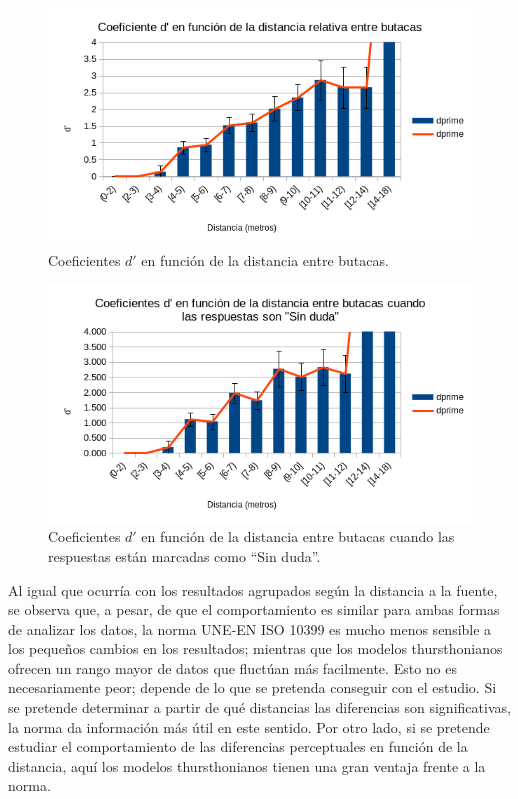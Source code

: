 \documentclass[11pt,a4paper,twoside]{book}
\begin{document}
		    \begin{figure}
                \includegraphics[scale=0.7]{../imagenes/analisisThurstButacasDuda.png}
			    \centering
			    \caption{Coeficientes $d'$ en función de la distancia entre butacas.} 
			    \label{fig:ThurstButacasDuda}
            \end{figure}
            
            \begin{figure}
                \includegraphics[scale=0.7]{../imagenes/analisisThurstButacasSinDuda.png}
			    \centering
			    \caption{Coeficientes $d'$ en función de la distancia entre butacas cuando las respuestas están marcadas como ``Sin duda''.} 
			    \label{fig:ThurstButacasSinDuda}
            \end{figure}
            
            Al igual que ocurría con los resultados agrupados según la distancia a la fuente, se observa que, a pesar, de que el comportamiento es similar para ambas formas de analizar los datos, la norma UNE-EN ISO 10399 es mucho menos sensible a los pequeños cambios en los resultados; mientras que los modelos thursthonianos ofrecen un rango mayor de datos que fluctúan más facilmente. Esto no es necesariamente peor; depende de lo que se pretenda conseguir con el estudio. Si se pretende determinar a partir de qué distancias las diferencias son significativas, la norma da información más útil en este sentido. Por otro lado, si se pretende estudiar el comportamiento de las diferencias perceptuales en función de la distancia, aquí los modelos thursthonianos tienen una gran ventaja frente a la norma.
		    
		    
   
\end{document}
